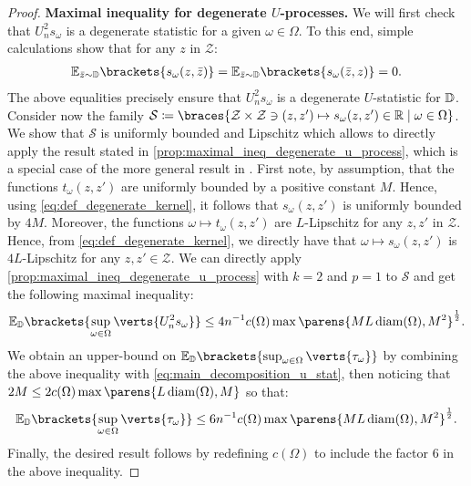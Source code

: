 \begin{proof}
{\bf Maximal inequality for degenerate $U$-processes.} We will first check that $U_n^2 s_{\omega}$ is a degenerate statistic for a given $\omega\in \Omega$. To this end, simple calculations show that for any $z$ in $\mathcal{Z}$:
\begin{align*}
	\mathbb{E}_{\bar{z}\sim \PP}\brackets{s_{\omega}(z,\bar{z})} =\mathbb{E}_{\bar{z}\sim \PP}\brackets{s_{\omega}(\bar{z},z)} = 0. 
\end{align*}
The above equalities precisely ensure that $U_n^2 s_{\omega}$ is a degenerate $U$-statistic for $\mathbb{D}$. 
Consider now the family $\mathcal{S}\coloneqq \braces{\mathcal{Z}\times \mathcal{Z}\ni(z,z')\mapsto s_{\omega}(z,z')\in \mathbb{R}\mid\omega\in\Omega}$. We show that $\mathcal{S}$ is uniformly bounded and Lipschitz which allows to directly apply the result stated in \cref{prop:maximal_ineq_degenerate_u_process}, which is a special case of the more general  result in \citep[Maximal inequality]{sherman1994maximal}. 
First note, by assumption, that the functions $t_{\omega}(z,z')$ are uniformly bounded by a positive constant $M$.  Hence, using \cref{eq:def_degenerate_kernel}, it follows that $s_{\omega}(z,z')$ is uniformly bounded by $4M$. Moreover, the functions $\omega\mapsto t_{\omega}(z,z')$ are $L$-Lipschitz for any $z,z'$ in $\mathcal{Z}$. Hence, from  \cref{eq:def_degenerate_kernel}, we directly have that $\omega \mapsto s_{\omega}(z,z')$ is $4L$-Lipschitz for any $z,z'\in \mathcal{Z}$. We can directly apply \cref{prop:maximal_ineq_degenerate_u_process} with $k=2$ and $p=1$ to  $\mathcal{S}$ and get the following maximal inequality:
\begin{align*}
	\mathbb{E}_{\PP}\brackets{\sup_{\omega\in \Omega} \verts{U^2_n s_{\omega}}}\leq 4n^{-1}  c(\Omega)\max\parens{ML\diam(\Omega),M^2}^{\frac{1}{2}}. 
\end{align*}
We obtain an upper-bound  on $\mathbb{E}_{\PP}\brackets{\sup_{\omega\in \Omega} \verts{\tau_{\omega}}}$ by combining the above inequality with 
  \cref{eq:main_decomposition_u_stat}, then noticing that $2M\leq 2c(\Omega)\max\parens{L\diam(\Omega),M}$ so that:
  \begin{align*}
	\mathbb{E}_{\PP}\brackets{\sup_{\omega\in \Omega} \verts{\tau_{\omega}}}\leq 6n^{-1}  c(\Omega)\max\parens{ML\diam(\Omega),M^2}^{\frac{1}{2}}. 
\end{align*}
Finally, the desired result follows by redefining $c(\Omega)$ to include the factor $6$ in the above inequality.  
\end{proof}